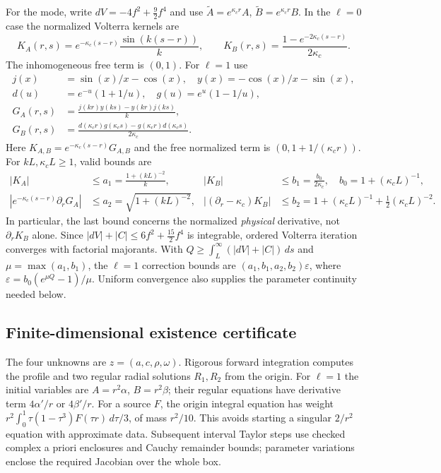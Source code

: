 For the mode, write $dV=-4f^2+\tfrac92 f^4$ and use
$\widetilde A=e^{\kappa_cr}A$, $\widetilde B=e^{\kappa_cr}B$.
In the $\ell=0$ case the normalized Volterra kernels are
\begin{equation}
 K_A(r,s)=e^{-\kappa_c(s-r)}\frac{\sin(k(s-r))}{k},\qquad
 K_B(r,s)=\frac{1-e^{-2\kappa_c(s-r)}}{2\kappa_c}.
 \label{eq:proof-l0-kernels}
\end{equation}
The inhomogeneous free term is $(0,1)$. For $\ell=1$ use
\begin{equation}
 \begin{aligned}
 j(x)&=\sin(x)/x-\cos(x),\quad y(x)=-\cos(x)/x-\sin(x),\\
 d(u)&=e^{-u}(1+1/u),\quad g(u)=e^u(1-1/u),\\
 G_A(r,s)&=\frac{j(kr)y(ks)-y(kr)j(ks)}{k},\\
 G_B(r,s)&=\frac{d(\kappa_cr)g(\kappa_cs)-g(\kappa_cr)d(\kappa_cs)}{2\kappa_c}.
 \end{aligned}
 \label{eq:proof-l1-kernels}
\end{equation}
Here $K_{A,B}=e^{-\kappa_c(s-r)}G_{A,B}$ and the free normalized
term is $(0,1+1/(\kappa_cr))$. For $kL,\kappa_cL\geq1$, valid bounds are
\begin{equation}
 \begin{aligned}
 |K_A|&\leq a_1=\frac{1+(kL)^{-2}}{k},&
 |K_B|&\leq b_1=\frac{b_0}{2\kappa_c},\quad b_0=1+(\kappa_cL)^{-1},\\
 |e^{-\kappa_c(s-r)}\partial_rG_A|&\leq a_2=\sqrt{1+(kL)^{-2}},&
 |(\partial_r-\kappa_c)K_B|&\leq b_2=1+(\kappa_cL)^{-1}
                                      +\tfrac12(\kappa_cL)^{-2}.
 \end{aligned}
 \label{eq:proof-l1-majorants}
\end{equation}
In particular, the last bound concerns the normalized \emph{physical}
derivative, not $\partial_rK_B$ alone. Since
$|dV|+|C|\leq6f^2+\tfrac{15}{2}f^4$ is integrable, ordered Volterra
iteration converges with factorial majorants. With
$Q\geq\int_L^\infty(|dV|+|C|)\,ds$ and $\mu=\max(a_1,b_1)$, the
$\ell=1$ correction bounds are $(a_1,b_1,a_2,b_2)\varepsilon$, where
$\varepsilon=b_0(e^{\mu Q}-1)/\mu$.
Uniform convergence also supplies the parameter continuity needed below.

\subsection{Finite-dimensional existence certificate}
\label{sec:proof-krawczyk}
The four unknowns are $z=(a,c,\rho,\omega)$. Rigorous forward integration
computes the profile and two regular radial solutions $R_1,R_2$ from
the origin. For $\ell=1$ the initial variables are
$A=r^2\alpha$, $B=r^2\beta$; their regular equations have derivative
term $4\alpha'/r$ or $4\beta'/r$. For a source $F$, the origin
integral equation has weight
$r^2\int_0^1\tau(1-\tau^3)F(\tau r)\,d\tau/3$, of mass $r^2/10$.
This avoids starting a singular $2/r^2$ equation with approximate data.
Subsequent interval Taylor steps use checked complex a priori enclosures
and Cauchy remainder bounds; parameter variations enclose the required
Jacobian over the whole box.

